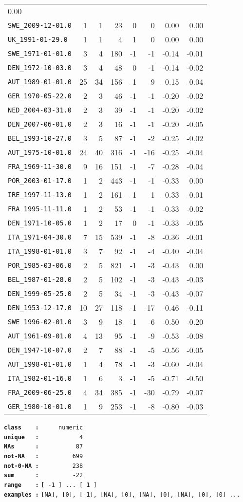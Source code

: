 \documentclass[]{article}
\begin{document}
\begin{longtable}[c]{@{}lrrrrrrr@{}}
0.00\tabularnewline
\texttt{SWE\_2009-12-01.0} & 1 & 1 & 23 & 0 & 0 & 0.00 &
0.00\tabularnewline
\texttt{UK\_1991-01-29.0} & 1 & 1 & 4 & 1 & 0 & 0.00 &
0.00\tabularnewline
\texttt{SWE\_1971-01-01.0} & 3 & 4 & 180 & -1 & -1 & -0.14 &
-0.01\tabularnewline
\texttt{DEN\_1972-10-03.0} & 3 & 4 & 48 & 0 & -1 & -0.14 &
-0.02\tabularnewline
\texttt{AUT\_1989-01-01.0} & 25 & 34 & 156 & -1 & -9 & -0.15 &
-0.04\tabularnewline
\texttt{GER\_1970-05-22.0} & 2 & 3 & 46 & -1 & -1 & -0.20 &
-0.02\tabularnewline
\texttt{NED\_2004-03-31.0} & 2 & 3 & 39 & -1 & -1 & -0.20 &
-0.02\tabularnewline
\texttt{DEN\_2007-06-01.0} & 2 & 3 & 16 & -1 & -1 & -0.20 &
-0.05\tabularnewline
\texttt{BEL\_1993-10-27.0} & 3 & 5 & 87 & -1 & -2 & -0.25 &
-0.02\tabularnewline
\texttt{AUT\_1975-10-01.0} & 24 & 40 & 316 & -1 & -16 & -0.25 &
-0.04\tabularnewline
\texttt{FRA\_1969-11-30.0} & 9 & 16 & 151 & -1 & -7 & -0.28 &
-0.04\tabularnewline
\texttt{POR\_2003-01-17.0} & 1 & 2 & 443 & -1 & -1 & -0.33 &
0.00\tabularnewline
\texttt{IRE\_1997-11-13.0} & 1 & 2 & 161 & -1 & -1 & -0.33 &
-0.01\tabularnewline
\texttt{FRA\_1995-11-11.0} & 1 & 2 & 53 & -1 & -1 & -0.33 &
-0.02\tabularnewline
\texttt{DEN\_1971-10-05.0} & 1 & 2 & 17 & 0 & -1 & -0.33 &
-0.05\tabularnewline
\texttt{ITA\_1971-04-30.0} & 7 & 15 & 539 & -1 & -8 & -0.36 &
-0.01\tabularnewline
\texttt{ITA\_1998-01-01.0} & 3 & 7 & 92 & -1 & -4 & -0.40 &
-0.04\tabularnewline
\texttt{POR\_1985-03-06.0} & 2 & 5 & 821 & -1 & -3 & -0.43 &
0.00\tabularnewline
\texttt{BEL\_1987-01-28.0} & 2 & 5 & 102 & -1 & -3 & -0.43 &
-0.03\tabularnewline
\texttt{DEN\_1999-05-25.0} & 2 & 5 & 34 & -1 & -3 & -0.43 &
-0.07\tabularnewline
\texttt{DEN\_1953-12-17.0} & 10 & 27 & 118 & -1 & -17 & -0.46 &
-0.11\tabularnewline
\texttt{SWE\_1996-02-01.0} & 3 & 9 & 18 & -1 & -6 & -0.50 &
-0.20\tabularnewline
\texttt{AUT\_1961-09-01.0} & 4 & 13 & 95 & -1 & -9 & -0.53 &
-0.08\tabularnewline
\texttt{DEN\_1947-10-07.0} & 2 & 7 & 88 & -1 & -5 & -0.56 &
-0.05\tabularnewline
\texttt{AUT\_1998-01-01.0} & 1 & 4 & 78 & -1 & -3 & -0.60 &
-0.04\tabularnewline
\texttt{ITA\_1982-01-16.0} & 1 & 6 & 3 & -1 & -5 & -0.71 &
-0.50\tabularnewline
\texttt{FRA\_2009-06-25.0} & 4 & 34 & 385 & -1 & -30 & -0.79 &
-0.07\tabularnewline
\texttt{GER\_1980-10-01.0} & 1 & 9 & 253 & -1 & -8 & -0.80 &
-0.03\tabularnewline
\bottomrule
\end{longtable}

\textbf{\texttt{class\ \ \ \ :}} \texttt{~~~~~numeric}\\
\textbf{\texttt{unique\ \ \ :}} \texttt{~~~~~~~~~~~4}\\
\textbf{\texttt{NAs\ \ \ \ \ \ :}} \texttt{~~~~~~~~~~87}\\
\textbf{\texttt{not-NA\ \ \ :}} \texttt{~~~~~~~~~699}\\
\textbf{\texttt{not-0-NA\ :}} \texttt{~~~~~~~~~238}\\
\textbf{\texttt{sum\ \ \ \ \ \ :}} \texttt{~~~~~~~~~-22}\\
\textbf{\texttt{range\ \ \ \ :}}
\texttt{{[}\ -1\ {]}\ ...\ {[}\ 1\ {]}}\\
\textbf{\texttt{examples\ :}}
\texttt{{[}NA{]},\ {[}0{]},\ {[}-1{]},\ {[}NA{]},\ {[}0{]},\ {[}NA{]},\ {[}0{]},\ {[}NA{]},\ {[}0{]},\ {[}0{]}\ ...}\\
\end{document}
